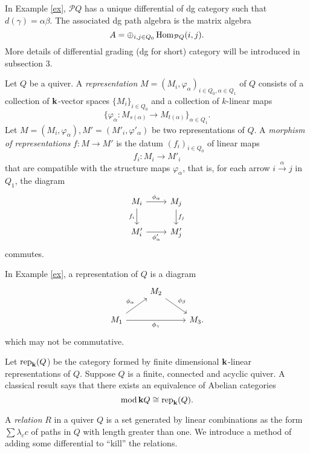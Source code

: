 In Example \ref{ex}, $\mathcal{P}Q$ has a unique differential of dg category
such that $d(\gamma) = \alpha \beta$.
The associated dg path algebra is the matrix algebra
\[ A = \oplus_{i,j \in Q_0} \operatorname{Hom}_{\mathcal{P}Q}(i,j). \]
More details of differential grading (dg for short) category
will be introduced in subsection 3.

Let $Q$ be a quiver. A \textit{representation}
$M = (M_i, \varphi_{\alpha})_{i \in Q_0,\alpha \in Q_1}$ of $Q$
consists of a collection of $\mathbf{k}$-vector spaces $\{M_i\}_{i \in Q_0}$
and a collection of $k$-linear maps
\[
  \bigl\{\varphi_{\alpha} : M_{s(\alpha)} \to M_{t(\alpha)}\bigr\}_{\alpha \in Q_1}.
\]
Let $M = (M_i, \varphi_{\alpha}), M' = (M'_i, \varphi'_{\alpha})$
be two representations of $Q$.
A \textit{morphism of representations} $f \colon M \to M'$
is the datum $(f_i)_{i \in Q_0}$ of linear maps
\[ f_i: M_i \to M'_i \]
that are compatible with the structure maps $\varphi_{\alpha}$,
that is, for each arrow $i \stackrel{\alpha}{\to} j$ in $Q_1$, the diagram
\[
  \begin{tikzcd}
    M_i \ar[d, "f_i"'] \ar[r, "\phi_\alpha"] & M_j \ar[d, "f_j"] \\
    M_i' \ar[r, "\phi'_\alpha"'] & M_j'
  \end{tikzcd}
\]
commutes.

In Example \ref{ex}, a representation of $Q$ is a diagram
\[
  \begin{tikzcd}
    & M_2 \ar[dr, "\phi_\beta"] & \\
    M_1 \ar[ur, "\phi_\alpha"] \ar[rr, "\phi_\gamma"'] & & M_3.
  \end{tikzcd}
\]
which may not be commutative.

Let $\operatorname{rep}_{\mathbf{k}}(Q$) be the category formed by
finite dimensional $\mathbf{k}$-linear representations of $Q$.
Suppose $Q$ is a finite, connected and acyclic quiver.
A classical result says that there exists an equivalence of Abelian categories
\begin{equation}\label{rep}
  \operatorname{mod} \mathbf{k} Q \cong \operatorname{rep}_{\mathbf{k}}(Q).
\end{equation}

A \textit{relation} $R$ in a quiver $Q$ is a set generated by
linear combinations as the form $\sum \lambda_c c$
of paths in $Q$ with length greater than one.
We introduce a method of adding some differential to ``kill'' the relations.

